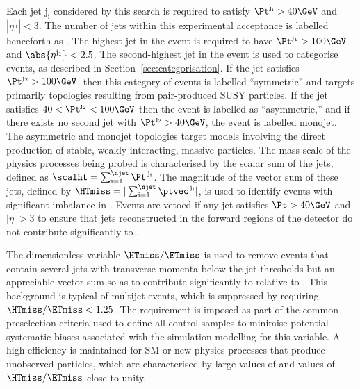 Each jet $\mathrm{j_i}$ considered by this search is required to satisfy
$\Pt^{\mathrm{j_i}} > 40\GeV$ and $|\eta^{\mathrm{j_i}}| < 3$. The number
of jets within this experimental acceptance is labelled henceforth as
\njet. The highest \Pt jet in the event is required to have
$\Pt^{\mathrm{j_1}} > 100\GeV$ and $\abs{\eta^{\mathrm{j_1}}} < 2.5$. The
second-highest \Pt jet in the event is used to categorise events, as
described in Section~\ref{sec:categorisation}. If the jet satisfies
$\Pt^{\mathrm{j_2}} > 100\GeV$, then this category of events is labelled
``symmetric'' and targets primarily topologies resulting from
pair-produced SUSY particles. 
If the jet satisfies $40 < \Pt^{\mathrm{j_2}} < 100\GeV$ then the event
is labelled as ``asymmetric,'' and if there exists no second jet with
$\Pt^{\mathrm{j_2}} > 40\GeV$, the event is labelled monojet. The
asymmetric and monojet topologies target models involving the direct
production of stable, weakly interacting, massive particles. 
The mass scale of the physics processes being probed is characterised
by the scalar \Pt sum of the jets, defined as $\scalht =
\sum_{\textrm{i}=1}^{\njet} \Pt^{\,\mathrm{j_i}}$. 
The magnitude of the vector \ptvec sum of these jets, defined by
$\HTmiss = |\sum_{\textrm{i}=1}^{\njet} \ptvec^{\,\mathrm{j_i}}|$, is
used to identify events with significant imbalance in
\ptvecmiss. Events are vetoed if any jet satisfies $\Pt > 40\GeV$ and
$|\eta| > 3$ to ensure that jets reconstructed in the forward regions
of the detector do not contribute significantly to \HTmiss.

The dimensionless variable $\HTmiss / \ETmiss$ is used to remove
events that contain several jets with transverse momenta below the jet
\Pt thresholds but an appreciable vector \Pt sum so as to contribute
significantly to \HTmiss relative to \ETmiss. This background is
typical of multijet events, which is suppressed by requiring $\HTmiss
/ \ETmiss < 1.25$. The requirement is imposed as part of the common
preselection criteria used to define all control samples to minimise
potential systematic biases associated with the simulation modelling
for this variable. A high efficiency is maintained for SM or
new-physics processes that produce unobserved particles, which are
characterised by large values of \ptvecmiss and values of $\HTmiss /
\ETmiss$ close to unity.

